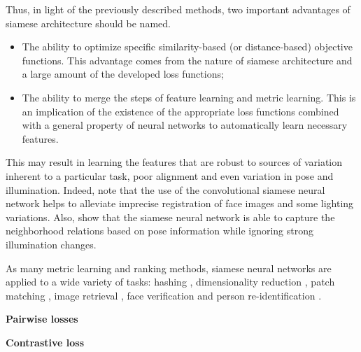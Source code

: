 Thus, in light of the previously described methods, two important advantages of siamese architecture should be named.
\begin{itemize}
    \item The ability to optimize specific similarity-based (or distance-based) objective functions. This advantage comes from the nature of siamese architecture and a large amount of the developed loss functions;
	\item The ability to merge the steps of feature learning and metric learning. This is an implication of the existence of the appropriate loss functions combined with a general property of neural networks to automatically learn necessary features. 
\end{itemize}

This may result in learning the features that are robust to sources of variation inherent to a particular task, \eg{} poor alignment and even variation in pose and illumination. Indeed, \citep{Chopra05} note that the use of the convolutional siamese neural network helps to alleviate imprecise registration of face images and some lighting variations. Also, \citep{hadsell2006dimensionality} show that the siamese neural network is able to capture the neighborhood relations based on pose information while ignoring strong illumination changes.

As many metric learning and ranking methods, siamese neural networks are applied to a wide variety of tasks: hashing \citep{Lin15}, dimensionality reduction \citep{hadsell2006dimensionality}, patch matching \citep{Simo15}, image retrieval \citep{Song16}, face verification \citep{Chopra05,Sun14,parkhi2015deep,SchroffKP15} and person re-identification \citep{Yi14}.


\bigskip\indent\textbf{Pairwise losses}


\bigskip\indent\textbf{Contrastive loss}
 
